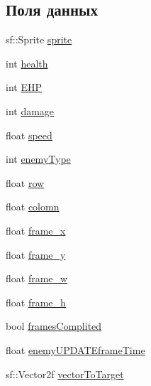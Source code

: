 \subsection*{Поля данных}
\begin{DoxyCompactItemize}
\item 
sf\+::\+Sprite \hyperlink{classGameObject_1_1Enemys_1_1EnemyTemlate_a496de410039d81c0d23a48baac8b358f}{sprite}
\item 
int \hyperlink{classGameObject_1_1Enemys_1_1EnemyTemlate_a500bead42bbb856a6ac92351917a4045}{health}
\item 
int \hyperlink{classGameObject_1_1Enemys_1_1EnemyTemlate_a250d0b4ec3f0d897a564866fc07d88ba}{E\+HP}
\item 
int \hyperlink{classGameObject_1_1Enemys_1_1EnemyTemlate_a0ebc979de5e65a6f8ad1d3177a11dbb4}{damage}
\item 
float \hyperlink{classGameObject_1_1Enemys_1_1EnemyTemlate_aa69529ceced0b3815dcd558250cdbb87}{speed}
\item 
int \hyperlink{classGameObject_1_1Enemys_1_1EnemyTemlate_a1fc3161000f20c3f67c148dade9d7cc3}{enemy\+Type}
\item 
float \hyperlink{classGameObject_1_1Enemys_1_1EnemyTemlate_affccc0ff4550536288e4c916980b2080}{row}
\item 
float \hyperlink{classGameObject_1_1Enemys_1_1EnemyTemlate_af2d7a8e83f70bb6c3bdf8a5760ab5f92}{colomn}
\item 
float \hyperlink{classGameObject_1_1Enemys_1_1EnemyTemlate_a4b48fcaa524fb492767f4de6ff10df91}{frame\+\_\+x}
\item 
float \hyperlink{classGameObject_1_1Enemys_1_1EnemyTemlate_a675a141480e64ba5ba85ad8d5c61fd3c}{frame\+\_\+y}
\item 
float \hyperlink{classGameObject_1_1Enemys_1_1EnemyTemlate_af58fe662ebf3cfd487d9863660c85956}{frame\+\_\+w}
\item 
float \hyperlink{classGameObject_1_1Enemys_1_1EnemyTemlate_a0d99581516d74d630535f1e4aff35938}{frame\+\_\+h}
\item 
bool \hyperlink{classGameObject_1_1Enemys_1_1EnemyTemlate_a3badead3c542bc494f789967e985f878}{frames\+Complited}
\item 
float \hyperlink{classGameObject_1_1Enemys_1_1EnemyTemlate_aa0fd588c672bd7f0b6531645f59712f3}{enemy\+U\+P\+D\+A\+T\+Eframe\+Time}
\item 
sf\+::\+Vector2f \hyperlink{classGameObject_1_1Enemys_1_1EnemyTemlate_af50eeadd76fdc2654945568205f7aef4}{vector\+To\+Target}
\item 

\end{DoxyCompactItemize}
